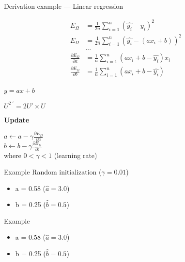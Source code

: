 \begin{frame}{Derivation example --- Linear regression}
  \begin{minipage}[l]{0.49\linewidth}
    \begin{align*}
      E_\Omega & = \frac{1}{2n} \sum_{i=1}^n( \hat{y_i} - y_i )^2 \\
      E_\Omega & = \frac{1}{2n}\sum_{i=1}^n( \hat{y_i} - (ax_i + b) )^2 \\
      & ... \\
      \frac{\partial E_\Omega}{\partial a} & = \frac{1}{n}\sum^n_{i=1}(ax_i + b - \hat{y_i})x_i \\
      \frac{\partial E_\Omega}{\partial b} & = \frac{1}{n}\sum^n_{i=1}(ax_i + b - \hat{y_i}) \\
    \end{align*}
  \end{minipage}\hfill
  \begin{minipage}[c]{0.49\linewidth}
    \begin{center}
      $\boxed{y = ax+b}$
    \end{center}

    \begin{center}
      $\boxed{U^{2\;\prime}=2U' \times U}$
    \end{center}
    \vfill
    \begin{center}
      \textbf{Update}

      $a \leftarrow a - \gamma\frac{\partial{E_{\Omega}}}{\partial{a}}$ \\
      $b \leftarrow b - \gamma\frac{\partial{E_{\Omega}}}{\partial{b}}$ \\
      $\;$ \\
      where $0 < \gamma < 1$ (learning rate)
    \end{center}
  \end{minipage}\hfill
\end{frame}

\begin{frame}{Example}
  Random initialization ($\gamma = 0.01$)
  \begin{itemize}
    \item a = 0.58 ($\hat{a} = 3.0$)
    \item b = 0.25 ($\hat{b} = 0.5$)
  \end{itemize}
\end{frame}

\begin{frame}{Example}
  \begin{itemize}
    \item a = 0.58 ($\hat{a} = 3.0$)
    \item b = 0.25 ($\hat{b} = 0.5$)
  \end{itemize}
\end{frame}

